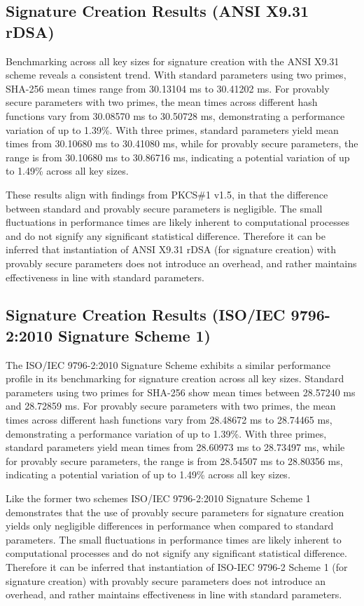 \documentclass[]{final_report}
\theoremstyle{definition}
\begin{document}
\subsection{Signature Creation Results (ANSI X9.31 rDSA)}

Benchmarking across all key sizes for signature creation with the ANSI X9.31 scheme reveals a consistent trend. With standard parameters using two primes, SHA-256 mean times range from 30.13104 ms to 30.41202 ms. For provably secure parameters with two primes, the mean times across different hash functions vary from 30.08570 ms to 30.50728 ms, demonstrating a performance variation of up to 1.39\%. With three primes, standard parameters yield mean times from 30.10680 ms to 30.41080 ms, while for provably secure parameters, the range is from 30.10680 ms to 30.86716 ms, indicating a potential variation of up to 1.49\% across all key sizes.


These results align with findings from PKCS\#1 v1.5, in that the difference between standard and provably secure parameters is negligible. The small fluctuations in performance times are likely inherent to computational processes and do not signify any significant statistical difference. Therefore it can be inferred that instantiation of ANSI X9.31 rDSA (for signature creation) with provably secure parameters does not introduce an overhead, and rather maintains effectiveness in line with standard parameters.

\subsection{Signature Creation Results (ISO/IEC 9796-2:2010 Signature Scheme 1)}

The ISO/IEC 9796-2:2010 Signature Scheme exhibits a similar performance profile in its benchmarking for signature creation across all key sizes. Standard parameters using two primes for SHA-256 show mean times between 28.57240 ms and 28.72859 ms. For provably secure parameters with two primes, the mean times across different hash functions vary from 28.48672 ms to 28.74465 ms, demonstrating a performance variation of up to 1.39\%. With three primes, standard parameters yield mean times from 28.60973 ms to 28.73497 ms, while for provably secure parameters, the range is from 28.54507 ms to 28.80356 ms, indicating a potential variation of up to 1.49\% across all key sizes.


Like the former two schemes ISO/IEC 9796-2:2010 Signature Scheme 1 demonstrates that the use of provably secure parameters for signature creation yields only negligible differences in performance when compared to standard parameters.  The small fluctuations in performance times are likely inherent to computational processes and do not signify any significant statistical difference. Therefore it can be inferred that instantiation of ISO-IEC 9796-2 Scheme 1 (for signature creation) with provably secure parameters does not introduce an overhead, and rather maintains effectiveness in line with standard parameters.
\end{document}
